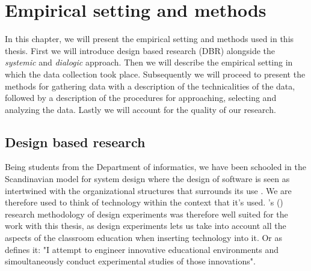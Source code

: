 \chapter{Empirical setting and methods}
In this chapter, we will present the empirical setting and methods used in this thesis. First we will introduce design based research (DBR) alongside the \emph{systemic} and \emph{dialogic} approach. Then we will describe the empirical setting in which the data collection took place. Subsequently we will proceed to present the methods for gathering data with a description of the technicalities of the data, followed by a description of the procedures for approaching, selecting and analyzing the data. Lastly we will account for the quality of our research.


\section{Design based research}
Being students from the Department of informatics, we have been schooled in the Scandinavian model for system design where the design of software is seen as intertwined with the organizational structures that surrounds its use \citep{bjerknes1987computers}. We are therefore used to think of technology within the context that it's used. \citeauthor{brown1992design}'s (\citeyear{brown1992design}) research methodology of design experiments was therefore well suited for the work with this thesis, as design experiments lets us take into account all the aspects of the classroom education when inserting technology into it. Or as \citet{brown1992design} defines it: "I attempt to engineer innovative educational environments and simoultaneously conduct experimental studies of those innovations".


